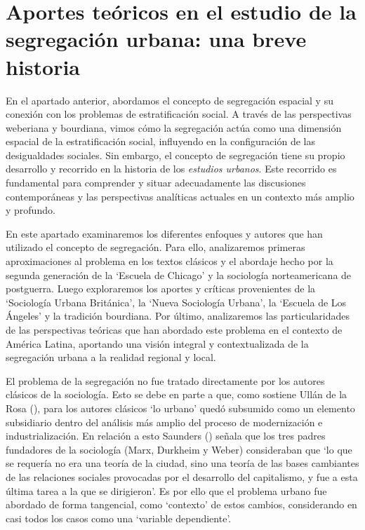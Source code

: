 \documentclass[
  spanish,
  a4paper,%
  chapterprefix=true,%
  DIV=calc,%
  twoside]{scrbook}%
\begin{document}
\section{Aportes teóricos en el estudio de la segregación urbana: una breve historia}\label{lit-history}

En el apartado anterior, abordamos el concepto de segregación espacial y
su conexión con los problemas de estratificación social. A través de las
perspectivas weberiana y bourdiana, vimos cómo la segregación actúa como
una dimensión espacial de la estratificación social, influyendo en la
configuración de las desigualdades sociales. Sin embargo, el concepto de
segregación tiene su propio desarrollo y recorrido en la historia de los
\emph{estudios urbanos}. Este recorrido es fundamental para comprender y
situar adecuadamente las discusiones contemporáneas y las perspectivas
analíticas actuales en un contexto más amplio y profundo.

En este apartado examinaremos los diferentes enfoques y autores que han
utilizado el concepto de segregación.
Para
ello, analizaremos primeras aproximaciones al problema en los textos
clásicos y el abordaje hecho por la segunda generación de la `Escuela de
Chicago' y la sociología norteamericana de postguerra. Luego
exploraremos los aportes y críticas provenientes de la `Sociología
Urbana Británica', la `Nueva Sociología Urbana', la `Escuela de Los
Ángeles' y la tradición bourdiana. Por último, analizaremos las
particularidades de las perspectivas teóricas que han abordado este
problema en el contexto de América Latina, aportando una visión integral
y contextualizada de la segregación urbana a la realidad regional y
local.

El problema de la segregación no fue tratado directamente por los
autores clásicos de la sociología. Esto se debe en parte a que, como
sostiene Ullán de la Rosa (), para los autores clásicos `lo
urbano' quedó subsumido como un elemento subsidiario dentro del análisis
más amplio del proceso de modernización e industrialización. En relación
a esto Saunders () señala que los tres padres fundadores de la
sociología (Marx, Durkheim y Weber) consideraban que `lo que se requería
no era una teoría de la ciudad, sino una teoría de las bases cambiantes
de las relaciones sociales provocadas por el desarrollo del capitalismo,
y fue a esta última tarea a la que se dirigieron'. Es por ello que el
problema urbano fue abordado de forma tangencial, como `contexto' de
estos cambios, considerando en casi todos los casos como una `variable
dependiente'.
\end{document}
